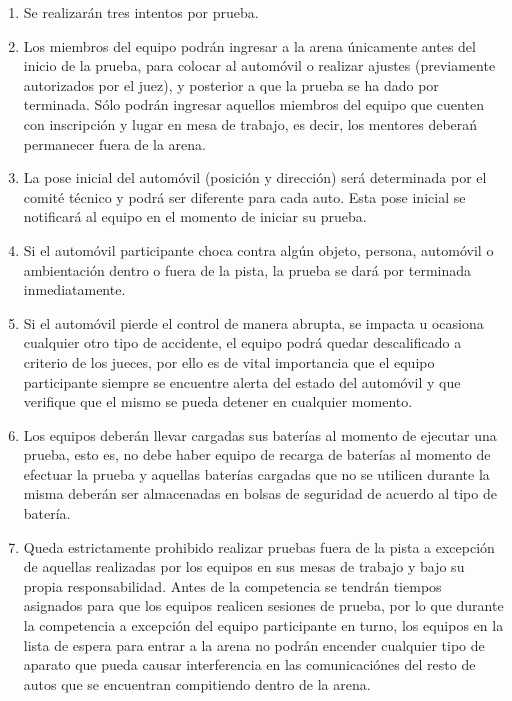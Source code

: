 \documentclass[letterpaper,12pt]{article}
\begin{document}
\begin{enumerate}
\item Se realizarán tres intentos por prueba. 

\item Los miembros del equipo podrán ingresar a la arena únicamente antes del inicio de la prueba, para colocar al automóvil o realizar ajustes (previamente autorizados por el juez), y posterior a que la prueba se ha dado por terminada. Sólo podrán ingresar aquellos miembros del equipo que cuenten con inscripción y lugar en mesa de trabajo, es decir, los mentores deberań permanecer fuera de la arena.

\item La pose inicial del automóvil (posición y dirección) será determinada por el comité técnico y podrá ser diferente para cada auto. Esta pose inicial se notificará al equipo en el momento de iniciar su prueba.

\item Si el automóvil participante choca contra algún objeto, persona, automóvil o ambientación dentro o fuera de la pista, la prueba se dará por terminada inmediatamente.

\item Si el automóvil pierde el control de manera abrupta, se impacta u ocasiona cualquier otro tipo de accidente, el equipo podrá quedar descalificado a criterio de los jueces, por ello es de vital importancia que el equipo participante siempre se encuentre alerta del estado del automóvil y que verifique que el mismo se pueda detener en cualquier momento.

\item Los equipos deberán llevar cargadas sus baterías al momento de ejecutar una prueba, esto es, no debe haber equipo de recarga de baterías al momento de efectuar la prueba y aquellas baterías cargadas que no se utilicen durante la misma deberán ser almacenadas en bolsas de seguridad de acuerdo al tipo de batería.

\item Queda estrictamente prohibido realizar pruebas fuera de la pista a excepción de aquellas realizadas por los equipos en sus mesas de trabajo y bajo su propia responsabilidad. Antes de la competencia se tendrán tiempos asignados para que los equipos realicen sesiones de prueba, por lo que durante la competencia a excepción del equipo participante en turno, los equipos en la lista de espera para entrar a la arena no podrán encender cualquier tipo de aparato que pueda causar interferencia en las comunicaciónes del resto de autos que se encuentran compitiendo dentro de la arena.
\end{enumerate}
\end{document}
